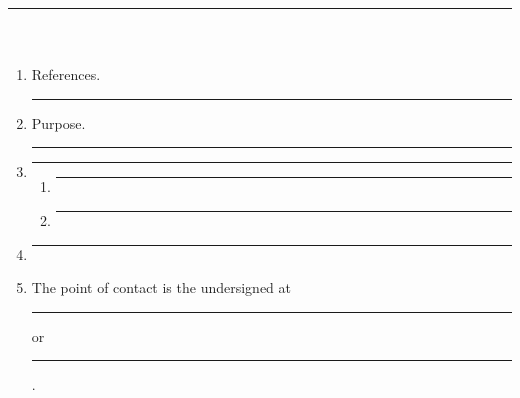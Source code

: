 \documentclass{armymemo}
\author{\rule{2in}{0.4pt}}             %
\title{\rule{2in}{0.4pt}}              %
\begin{document}
\begin{enumerate}

  \item References.
        \rule{4.5in}{0.4pt}

  \item Purpose.
        \rule{5.5in}{0.4pt}

  \item %
        \rule{5.5in}{0.4pt}

        \begin{enumerate}
          \item \rule{5in}{0.4pt}   %
          \item \rule{5in}{0.4pt}   %
        \end{enumerate}

  \item %
        \rule{5.5in}{0.4pt}

  \item The point of contact is the undersigned at
        \rule{1.6in}{0.4pt} or \rule{2.2in}{0.4pt}.

\end{enumerate}
\end{document}
